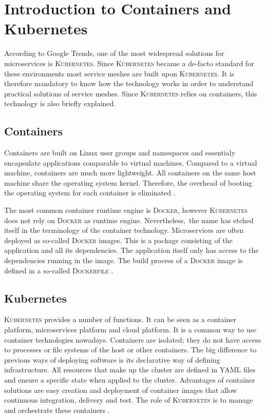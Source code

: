\section{Introduction to Containers and Kubernetes}

According to Google Trends, one of the most widespread solutions for microservices is \textsc{Kubernetes}.
Since \textsc{Kubernetes} became a de-facto standard for these environments most service meshes are built upon \textsc{Kubernetes}. It is therefore mandatory to know how the technology works in order to understand practical solutions of service meshes. Since \textsc{Kubernetes} relies on containers, this technology is also briefly explained.

\subsection{Containers}

Containers are built on Linux user groups and namespaces and essentialy encapsulate applications comparable to virtual machines. Compared to a virtual machine, containers are much more lightweight. All containers on the same host machine share the operating system kernel. Therefore, the overhead of booting the operating system for each container is eliminated \cite[p. 220 ff.]{sm3}.

The most common container runtime engine is \textsc{Docker}, however \textsc{Kubernetes} does not rely on \textsc{Docker} as runtime engine. Nevertheless, the name has etched itself in the terminology of the container technology. Microservices are often deployed as so-called \textsc{Docker} images. This is a package consisting of the application and all its dependencies. The application itself only has access to the dependencies running in the image. The build process of a \textsc{Docker} image is defined in a so-called \textsc{Dockerfile} \cite[p. 224]{sm3}.

\subsection{Kubernetes}

\textsc{Kubernetes} provides a number of functions. It can be seen as a container platform, microservices platform and cloud platform.
It is a common way to use container technologies nowadays. Containers are isolated; they do not have access to processes or file systems of the host or other containers. The big difference to previous ways of deploying software is its declarative way of defining infrastructure. All resources that make up the cluster are defined in YAML files and ensure a specific state when applied to the cluster.
Advantages of container solutions are easy creation and deployment of container images that allow continuous integration, delivery and test. The role of \textsc{Kubernetes} is to manage and orchestrate these containers \cite{k8s}.

